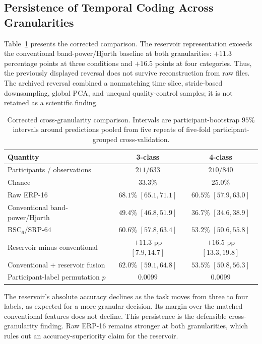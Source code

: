 \subsection{Persistence of Temporal Coding Across Granularities}

Table~\ref{tab:regime_comparison} presents the corrected comparison. The reservoir representation exceeds the conventional band-power/Hjorth baseline at both granularities: $+11.3$ percentage points at three conditions and $+16.5$ points at four categories. Thus, the previously displayed reversal does not survive reconstruction from raw files. The archived reversal combined a nonmatching time slice, stride-based downsampling, global PCA, and unequal quality-control samples; it is not retained as a scientific finding.

\begin{table}[t]
\centering
\caption{Corrected cross-granularity comparison. Intervals are participant-bootstrap $95\%$ intervals around predictions pooled from five repeats of five-fold participant-grouped cross-validation.}
\label{tab:regime_comparison}
\small
\renewcommand{\arraystretch}{1.15}
\begin{tabular}{lcc}
\hline
\textbf{Quantity} & \textbf{3-class} & \textbf{4-class} \\
\hline
Participants / observations & $211/633$ & $210/840$ \\
Chance & $33.3\%$ & $25.0\%$ \\
Raw ERP-16 & $68.1\%$ $[65.1,71.1]$ & $60.5\%$ $[57.9,63.0]$ \\
Conventional band-power/Hjorth & $49.4\%$ $[46.8,51.9]$ & $36.7\%$ $[34.6,38.9]$ \\
BSC$_6$/SRP-64 & $60.6\%$ $[57.8,63.4]$ & $53.2\%$ $[50.6,55.8]$ \\
Reservoir minus conventional & $+11.3$ pp $[7.9,14.7]$ & $+16.5$ pp $[13.3,19.8]$ \\
Conventional + reservoir fusion & $62.0\%$ $[59.1,64.8]$ & $53.5\%$ $[50.8,56.3]$ \\
Participant-label permutation $p$ & $0.0099$ & $0.0099$ \\
\hline
\end{tabular}
\end{table}

The reservoir's absolute accuracy declines as the task moves from three to four labels, as expected for a more granular decision. Its margin over the matched conventional features does not decline. This persistence is the defensible cross-granularity finding. Raw ERP-16 remains stronger at both granularities, which rules out an accuracy-superiority claim for the reservoir.

